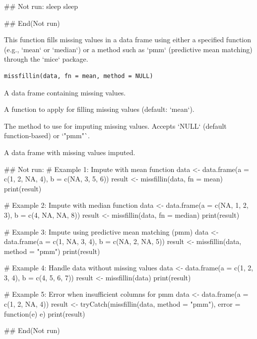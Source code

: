 \documentclass[a4paper]{book}
\begin{document}
%
\begin{Examples}
\begin{ExampleCode}
## Not run: 
 sleep %
sleep %

## End(Not run)


\end{ExampleCode}
\end{Examples}
%
\begin{Description}
This function fills missing values in a data frame using either a specified function (e.g., `mean` or `median`)
or a method such as `pmm` (predictive mean matching) through the `mice` package.
\end{Description}
%
\begin{Usage}
\begin{verbatim}
missfillin(data, fn = mean, method = NULL)
\end{verbatim}
\end{Usage}
%
\begin{Arguments}
\begin{ldescription}
\item[\code{data}] A data frame containing missing values.

\item[\code{fn}] A function to apply for filling missing values (default: `mean`).

\item[\code{method}] The method to use for imputing missing values. Accepts `NULL` (default function-based) or `"pmm"`.
\end{ldescription}
\end{Arguments}
%
\begin{Value}
A data frame with missing values imputed.
\end{Value}
%
\begin{Examples}
\begin{ExampleCode}
## Not run: 
# Example 1: Impute with mean function
data <- data.frame(a = c(1, 2, NA, 4), b = c(NA, 3, 5, 6))
result <- missfillin(data, fn = mean)
print(result)

# Example 2: Impute with median function
data <- data.frame(a = c(NA, 1, 2, 3), b = c(4, NA, NA, 8))
result <- missfillin(data, fn = median)
print(result)

# Example 3: Impute using predictive mean matching (pmm)
data <- data.frame(a = c(1, NA, 3, 4), b = c(NA, 2, NA, 5))
result <- missfillin(data, method = "pmm")
print(result)

# Example 4: Handle data without missing values
data <- data.frame(a = c(1, 2, 3, 4), b = c(4, 5, 6, 7))
result <- missfillin(data)
print(result)

# Example 5: Error when insufficient columns for pmm
data <- data.frame(a = c(1, 2, NA, 4))
result <- tryCatch(missfillin(data, method = "pmm"), error = function(e) e)
print(result)

## End(Not run)
\end{ExampleCode}
\end{Examples}
\end{document}

